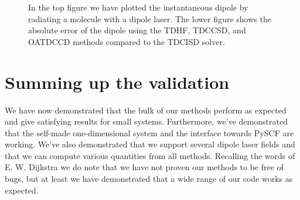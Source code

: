 \begin{figure}
            \caption{In the top figure we have plotted the instantaneous
            dipole by radiating a  molecule with a dipole laser.
            The lower figure shows the absolute error of the dipole using the
            TDHF, TDCCSD, and OATDCCD methods compared to the TDCISD solver.}
            \label{fig:dipole-moment-li}
        \end{figure}

    \section{Summing up the validation}
        We have now demonstrated that the bulk of our methods perform as
        expected and give satisfying results for small systems.
        Furthermore, we've demonstrated that the self-made one-dimensional
        system and the interface towards PySCF \cite{pyscf} are working.
        We've also demonstrated that we support several dipole laser fields and
        that we can compute various quantities from all methods.
        Recalling the words of E. W. Dijkstra we do note that we have not proven
        our methods to be free of bugs, but at least we have demonstrated that a
        wide range of our code works as expected.

\clearpage
